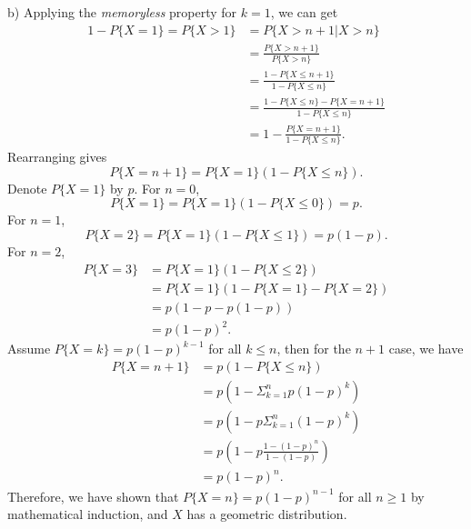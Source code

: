 \begin{solution}
  b) Applying the \textit{memoryless} property for $k=1$, we can get
  \begin{align*}
    1 - P\{X=1\} = P\{X>1\} &= P\{X>n+1|X>n\} \\
      &= \frac{P\{X>n+1\}}{P\{X>n\}} \\
      &= \frac{1 - P\{X\leq n+1\}}{1 - P\{X\leq n\}} \\
      &= \frac{1 - P\{X\leq n\} - P\{X= n+1\}}{1 - P\{X\leq n\}} \\
      &= 1 - \frac{P\{X= n+1\}}{1 - P\{X\leq n\}} .
  \end{align*}
  Rearranging gives
  \[ P\{X=n+1\} = P\{X=1\}(1-P\{X\leq n\}) .\]
  Denote $P\{X=1\}$ by $p$. For $n=0$,
  \[ P\{X=1\} = P\{X=1\}(1-P\{X\leq 0\}) = p .\]
  For $n=1$,
  \[ P\{X=2\} = P\{X=1\}(1-P\{X\leq 1\}) = p(1-p) .\]
  For $n=2$,
  \begin{align*}
    P\{X=3\} &= P\{X=1\}(1-P\{X\leq 2\}) \\
      &= P\{X=1\}(1-P\{X=1\}-P\{X=2\}) \\
      &= p(1-p-p(1-p)) \\
      &= p(1-p)^2.
  \end{align*}
  Assume $P\{X=k\}=p(1-p)^{k-1}$ for all $k\leq n$, then for the $n+1$ case, we have
  \begin{align*}
    P\{X=n+1\} &= p(1-P\{X\leq n\}) \\
      &= p(1 - \Sigma_{k=1}^n p(1-p)^k) \\
      &= p(1 - p\Sigma_{k=1}^n (1-p)^k) \\
      &= p(1 - p \frac{1-(1-p)^n}{1-(1-p)}) \\
      &= p(1-p)^n .
  \end{align*}
  Therefore, we have shown that $P\{X=n\} = p(1-p)^{n-1}$ for all $n\geq 1$ by mathematical induction, and $X$ has a geometric distribution.
\end{solution}


